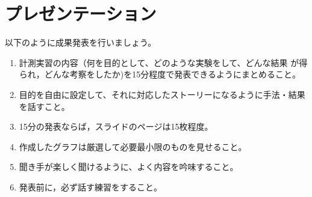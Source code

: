 \documentclass{jarticle}
\begin{document}
\section{プレゼンテーション}
以下のように成果発表を行いましょう。

\begin{enumerate}
\item 計測実習の内容（何を目的として、どのような実験をして、どんな結果
  が得られ，どんな考察をしたか)を15分程度で発表できるようにまとめること。
\item 目的を自由に設定して、それに対応したストーリーになるように手法・結果を話すこと。
\item 15分の発表ならば，スライドのページは15枚程度。
\item 作成したグラフは厳選して必要最小限のものを見せること。
\item 聞き手が楽しく聞けるように、よく内容を吟味すること。
\item 発表前に，必ず話す練習をすること。
\end{enumerate}
\end{document}
